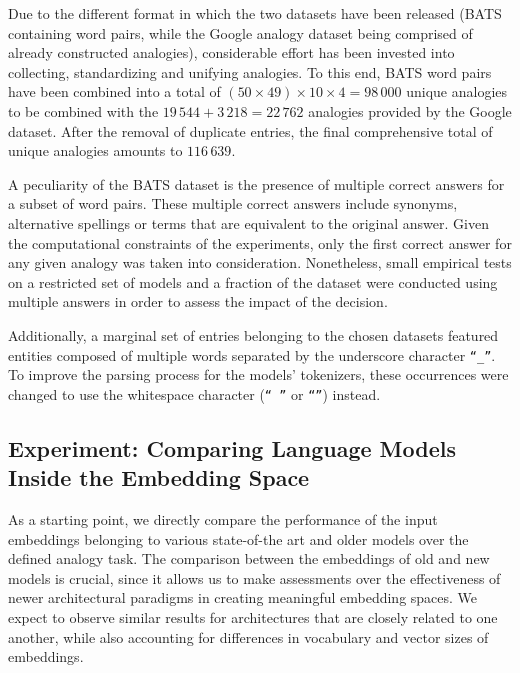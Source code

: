 Due to the different format in which the two datasets have been released (BATS containing word pairs, while the Google analogy dataset being comprised of already constructed analogies), considerable effort has been invested into collecting, standardizing and unifying analogies.
To this end, BATS word pairs have been combined into a total of $(50 \times 49) \times 10 \times 4 = 98\,000$ unique analogies to be combined with the $19\,544 + 3\,218 = 22\,762$ analogies provided by the Google dataset.
After the removal of duplicate entries, the final comprehensive total of unique analogies amounts to $116\,639$.

A peculiarity of the BATS dataset is the presence of multiple correct answers for a subset of word pairs.
These multiple correct answers include synonyms, alternative spellings or terms that are equivalent to the original answer.
Given the computational constraints of the experiments, only the first correct answer for any given analogy was taken into consideration.
Nonetheless, small empirical tests on a restricted set of models and a fraction of the dataset were conducted using multiple answers in order to assess the impact of the decision.

Additionally, a marginal set of entries belonging to the chosen datasets featured entities composed of multiple words separated by the underscore character \texttt{``\_''}.
To improve the parsing process for the models' tokenizers, these occurrences were changed to use the whitespace character (\texttt{`` ''} or \texttt{``\textvisiblespace{}''}) instead.

\subsection[Experiment: Comparing Language Models Inside the Embedding Space]{Experiment: Comparing Language Models \texorpdfstring{\linebreak}{} Inside the Embedding Space}\label{ssec:exp_emb_exp1}

As a starting point, we directly compare the performance of the input embeddings belonging to various state-of-the art and older models over the defined analogy task.
The comparison between the embeddings of old and new models is crucial, since it allows us to make assessments over the effectiveness of newer architectural paradigms in creating meaningful embedding spaces.
We expect to observe similar results for architectures that are closely related to one another, while also accounting for differences in vocabulary and vector sizes of embeddings.

